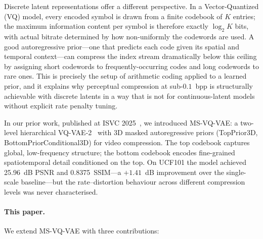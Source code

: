 \documentclass{article}
\newcommand{\model}{\textsc{MS-VQ-VAE}}
\begin{document}
Discrete latent representations offer a different perspective.
In a Vector-Quantized (VQ) model, every encoded symbol is drawn from a finite
codebook of $K$ entries; the maximum information content per symbol is therefore
exactly $\log_2 K$ bits, with actual bitrate determined by how non-uniformly
the codewords are used.
A good autoregressive prior---one that predicts each code given its
spatial and temporal context---can compress the index stream dramatically
below this ceiling by assigning short codewords to frequently-occurring codes
and long codewords to rare ones.
This is precisely the setup of arithmetic coding applied to a learned prior,
and it explains why perceptual compression at sub-$0.1$~bpp is structurally
achievable with discrete latents in a way that is not for continuous-latent
models without explicit rate penalty tuning.

In our prior work, published at ISVC 2025~\cite{kotthapalli2024msvqvae},
we introduced \model{}: a two-level hierarchical VQ-VAE-2~\cite{vqvae2}
with 3D masked autoregressive priors (TopPrior3D, BottomPriorConditional3D)
for video compression.
The top codebook captures global, low-frequency structure; the bottom
codebook encodes fine-grained spatiotemporal detail conditioned on the top.
On UCF101 the model achieved 25.96~dB PSNR and 0.8375~SSIM---a $+1.41$~dB
improvement over the single-scale baseline---but the rate--distortion
behaviour across different compression levels was never characterised.

\paragraph{This paper.}
We extend \model{} with three contributions:
\end{document}

